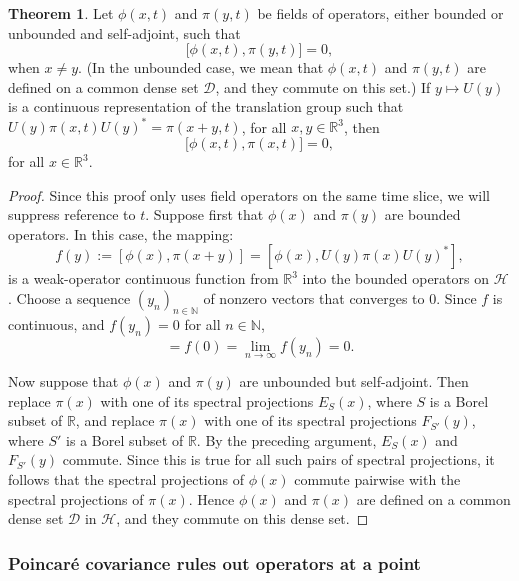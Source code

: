 \documentclass[12pt]{article}
\theoremstyle{definition}
\newtheorem{thm}{Theorem}[section]
\theoremstyle{definition}
\newcommand{\mb}[1]{#1}
\theoremstyle{remark}
\def\2#1{{\mathcal #1}}
\def\7#1{{\mathbb #1}}
\begin{document}
\begin{thm} Let $\phi (x,t)$ and $\pi (y,t)$ be fields of operators, either bounded
  or unbounded and self-adjoint, such that
  \[ {[}\phi (x,t),\pi (y,t){]}=0 ,\] when $\mb{x}\neq y$.  (In the
  unbounded case, we mean that $\phi (x,t)$ and $\pi (y,t)$ are defined on a common
  dense set $\2D$, and they commute on this set.)  If $y\mapsto U(y)$ is a continuous
  representation of the translation group such that $U(y)\pi (x,t)U(y)^*=\pi
  (x+y,t)$, for all $x,y\in \mathbb{R}^{3}$, then
  \[ {[}\phi (x,t),\pi (x,t){]}=0 ,\] for all
  $\mb{x}\in \mathbb{R}^{3}$. \end{thm}

\begin{proof} Since this proof only uses field operators on the same time slice, we
  will suppress reference to $t$.  Suppose first that $\phi (x)$ and $\pi (y)$ are
  bounded operators.  In this case, the mapping:
  \begin{equation} f(y):=[\phi (x),\pi (x+y)]=[\phi (x),U(y)\pi (x)U(y)^*]
    ,\end{equation} is a weak-operator continuous function from $\mathbb{R}^{3}$ into
  the bounded operators on $\2H$.  Choose a sequence $(y_n)_{n\in \7N}$ of nonzero
  vectors that converges to $0$.  Since $f$ is continuous, and $f(y _n )=0$ for all
  $n\in \mathbb{N}$,
  \begin{equation} [\phi (x),\pi (x)]=f(0)=\lim _{n\rightarrow \infty}f(y_n )=0
    .\end{equation}

  Now suppose that $\phi (x)$ and $\pi (y)$ are unbounded but self-adjoint.  Then
  replace $\pi (x)$ with one of its spectral projections $E_S(x)$, where $S$ is a
  Borel subset of $\7R$, and replace $\pi (x)$ with one of its spectral projections
  $F_{S'}(y)$, where $S'$ is a Borel subset of $\7R$.  By the preceding argument,
  $E_S(x)$ and $F_{S'}(y)$ commute.  Since this is true for all such pairs of
  spectral projections, it follows that the spectral projections of $\phi (x)$
  commute pairwise with the spectral projections of $\pi (x)$.  Hence $\phi (x)$ and
  $\pi (x)$ are defined on a common dense set $\2D$ in $\2H$, and they commute on
  this dense set.
\end{proof}

\subsubsection{Poincar{\'e} covariance rules out operators at a point}
\end{document}
